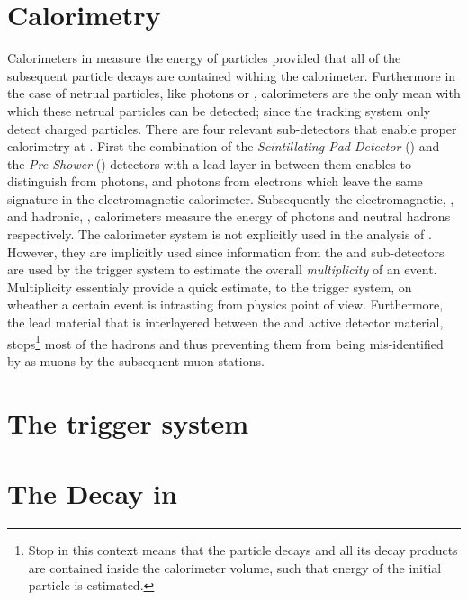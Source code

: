 \section{Calorimetry}
\label{det_calo}
Calorimeters in \lhcb measure the energy of particles provided that all of the subsequent particle decays are
contained withing the calorimeter. Furthermore in the case of netrual particles, like photons or \piz,
calorimeters are the only mean with which these netrual particles can be detected; since the tracking system
only detect charged particles. There are four relevant sub-detectors
that enable proper calorimetry at \lhcb. First the combination of the {\it Scintillating Pad Detector} (\spd)
and the {\it Pre Shower} (\presh) detectors with a lead layer in-between them enables to distinguish \piz from
photons, and photons from electrons which leave the same signature in the electromagnetic calorimeter.
Subsequently the electromagnetic, \ecal, and hadronic, \hcal, calorimeters measure the energy of photons
and neutral hadrons respectively. The calorimeter system is not explicitly used in the analysis of .
However, they are implicitly used since information from the \spd and \presh sub-detectors are used
by the \lzero trigger system to estimate the overall {\it multiplicity} of an event. Multiplicity essentialy
provide a quick estimate, to the \lzero trigger system, on wheather a certain event is intrasting from physics
point of view. Furthermore, the lead material that is interlayered between the \ecal and \hcal active detector material,
stops\footnote{Stop in this context means that the particle decays and all its decay products are contained inside the calorimeter
volume, such that energy of the initial particle is estimated.} most of the hadrons and thus preventing them
from being mis-identified by as muons by the subsequent muon stations.

\section{The trigger system}
\label{det_trigger}


\section{The \BJpsiKst Decay in \lhcb}
\label{BspsiKst_at_lhcb}

